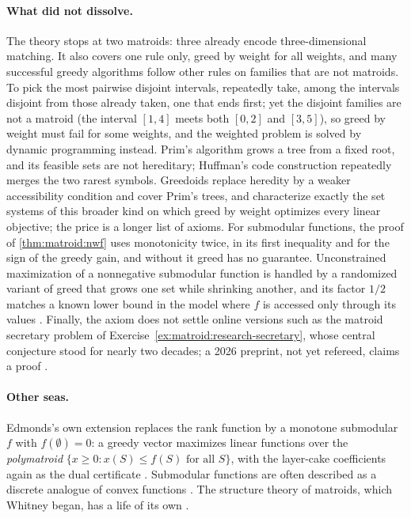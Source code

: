 \begin{refsection}
\paragraph{What did not dissolve.} The theory stops at two matroids: three already encode three-dimensional matching. It also covers one rule only, greed by weight for all weights, and many successful greedy algorithms follow other rules on families that are not matroids. To pick the most pairwise disjoint intervals, repeatedly take, among the intervals disjoint from those already taken, one that ends first; yet the disjoint families are not a matroid (the interval $[1,4]$ meets both $[0,2]$ and $[3,5]$), so greed by weight must fail for some weights, and the weighted problem is solved by dynamic programming instead. Prim's algorithm grows a tree from a fixed root, and its feasible sets are not hereditary; Huffman's code construction repeatedly merges the two rarest symbols. Greedoids \parencite{KorteLovasz1981} replace heredity by a weaker accessibility condition and cover Prim's trees, and \textcite{HelmanMoretShapiro1993} characterize exactly the set systems of this broader kind on which greed by weight optimizes every linear objective; the price is a longer list of axioms. For submodular functions, the proof of \cref{thm:matroid:nwf} uses monotonicity twice, in its first inequality and for the sign of the greedy gain, and without it greed has no guarantee. Unconstrained maximization of a nonnegative submodular function is handled by a randomized variant of greed that grows one set while shrinking another, and its factor $1/2$ matches a known lower bound in the model where $f$ is accessed only through its values \parencite{BuchbinderFeldmanNaorSchwartz2015}. Finally, the axiom does not settle online versions such as the matroid secretary problem of Exercise~\ref{ex:matroid:research-secretary}, whose central conjecture \parencite{BabaioffImmorlicaKleinberg2007} stood for nearly two decades; a 2026 preprint, not yet refereed, claims a proof \parencite{Singla2026}.

\paragraph{Other seas.} Edmonds's own extension replaces the rank function by a monotone submodular $f$ with $f(\emptyset)=0$: a greedy vector maximizes linear functions over the \emph{polymatroid} $\{x\ge0 : x(S)\le f(S)\text{ for all }S\}$, with the layer-cake coefficients again as the dual certificate \parencite{Edmonds1970}. Submodular functions are often described as a discrete analogue of convex functions \parencite[Chapter~44]{Schrijver2003}. The structure theory of matroids, which Whitney began, has a life of its own \parencite{Oxley2011}.


\end{refsection}
